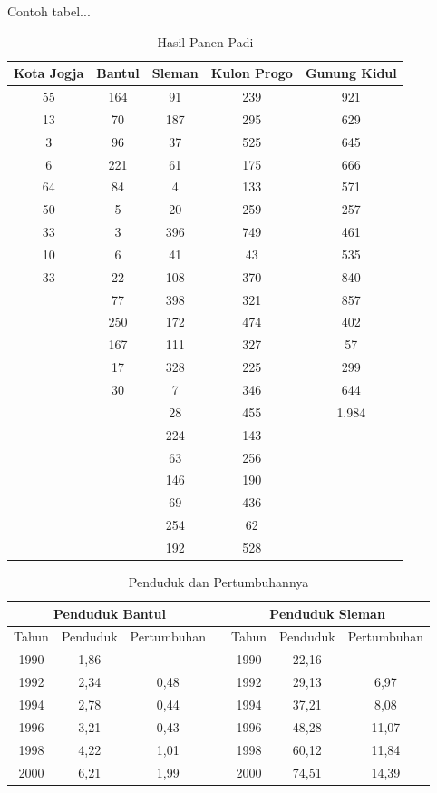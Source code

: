 Contoh tabel...
\begin{longtable}{|c|c|c|c|c|}
 \caption{Hasil Panen Padi}\label{tran7}\\
 \hline
  Kota Jogja&Bantul&Sleman&Kulon Progo&Gunung Kidul \\
  \hline
  55 & 164 & 91 & 239 & 921 \\
  \hline
  13 & 70 & 187 & 295 & 629 \\
  \hline
  3 & 96 & 37 & 525 & 645 \\
  \hline
  6 & 221 & 61 & 175 & 666 \\
  \hline
  64 & 84 & 4 & 133 & 571 \\
  \hline
  50 & 5 & 20 & 259 & 257 \\
  \hline
  33 & 3 & 396 & 749 & 461 \\
  \hline
  10 & 6 & 41 & 43 & 535 \\
  \hline
  33 & 22 & 108 & 370 & 840 \\
  \hline
  & 77& 398 & 321 & 857 \\
  \hline
  & 250 & 172 & 474 & 402 \\
  \hline
  & 167 & 111 & 327 & 57 \\
  \hline
  & 17 & 328 & 225 & 299 \\
  \hline
  & 30 & 7 & 346 & 644 \\
  \hline
  &  & 28 & 455 & 1.984 \\
  \hline
  &  & 224 & 143 &  \\
  \hline
  &  & 63 & 256 &  \\
  \hline
  &  & 146 & 190 &  \\
  \hline
  &  & 69 & 436 &  \\
  \hline
  &  & 254 & 62 &  \\
  \hline
  &  & 192 & 528 &  \\
  \hline
\end{longtable}


\begin{longtable}{|ccccccc|}
\caption{Penduduk dan Pertumbuhannya }\label{tran3}\\
\hline
 \multicolumn{3}{|c}{Penduduk Bantul} & & \multicolumn{3}{c|}{Penduduk Sleman} \\
  \hline
   Tahun  &   Penduduk    &   Pertumbuhan   &    &  Tahun    &  Penduduk     & Pertumbuhan\\
  \hline
  1990 & 1,86  &      &    & 1990 & 22,16  &  \\
  1992 & 2,34  & 0,48 &    & 1992 & 29,13  & 6,97 \\
  1994 & 2,78  & 0,44 &    & 1994 & 37,21  & 8,08\\
  1996 & 3,21  & 0,43 &    & 1996 & 48,28  & 11,07 \\
  1998 & 4,22  & 1,01 &    & 1998 & 60,12  & 11,84\\
  2000 & 6,21  & 1,99 &    & 2000 & 74,51  & 14,39\\\hline
\end{longtable}
